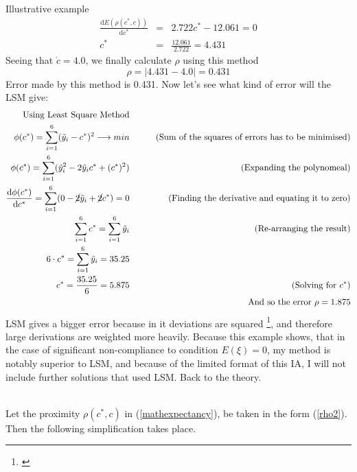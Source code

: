 \begin{subsection}{Illustrative example}
\begin{eqnarray*}
\frac{\mathrm{d}E(\rho(c^{*},c))}{\mathrm{d}c^{*}} &=& 2.722c^{*}-12.061 = 0 \\
c^{*} &=& \frac{12.061}{2.722} = 4.431
\end{eqnarray*}
Seeing that $\dot{c} = 4.0$, we finally calculate $\rho$ using this method
\begin{equation*}
\rho = |4.431-4.0| = 0.431
\end{equation*}
Error made by this method is 0.431. Now let's see what kind of error will the LSM give:
\begin{eqnarray*}
\text{Using Least Square Method} \\
\phi(c^{*})= \sum\limits_{i=1}^{6}(\tilde{y}_{i}-c^{*})^{2} \longrightarrow min &\qquad & \text{(Sum of the squares of errors has to be minimised)}\\
\phi(c^{*})= \sum\limits_{i=1}^{6}(\tilde{y}_{i}^{2}-2 \tilde{y}_{i}c^{*} + (c^{*})^{2}) &\qquad & \text{(Expanding the polynomeal)}\\
\frac{\mathrm{d}\phi(c^{*})}{\mathrm{d}c^{*}} =  \sum\limits_{i=1}^{6}(0 -\cancel{2} \tilde{y}_{i} +\cancel{2} c^{*}) = 0  &\qquad & \text{(Finding the derivative and equating it to zero)}\\
 \sum\limits_{i=1}^{6}c^{*} = \sum\limits_{i=1}^{6} \tilde{y}_{i} &\qquad & \text{(Re-arranging the result)}\\
 6 \cdot c^{*} = \sum\limits_{i=1}^{6} \tilde{y}_{i} = 35.25 &\qquad & \\
 c^{*} = \frac{35.25}{6} = 5.875 &\qquad & \text{(Solving for $c^{*}$)}\\
& \qquad & \text{And so the error } \rho = 1.875
\end{eqnarray*}
LSM gives a bigger error because in it deviations are squared \footnote{\cite{Plackett_1950}}, and therefore large derivations are weighted more heavily. Because this example shows, that in the case of significant non-compliance to condition $E(\xi)=0$, my method is notably superior to LSM, and because of the limited format of this IA, I will not include further solutions that used LSM. %
 Back to the theory.\\
\\
\end{subsection}
Let the proximity $\rho(c^{*},c)$ in (\ref{mathexpectancy}), be taken in the form (\ref{rho2}). Then the following simplification takes place.
